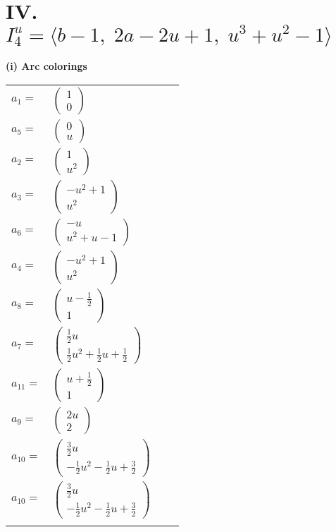 \documentclass[1p]{elsarticle_modified}
\theoremstyle{definition}
\begin{document}
\centering \section*{IV. $I^u_{4}= \langle b-1,\;2 a-2 u+1,\;u^3+u^2-1 \rangle$}
\flushleft \textbf{(i) Arc colorings}\\
\begin{tabular}{m{7pt} m{180pt} m{7pt} m{180pt} }
\flushright $a_{1}=$&$\begin{pmatrix}1\\0\end{pmatrix}$ \\
\flushright $a_{5}=$&$\begin{pmatrix}0\\u\end{pmatrix}$ \\
\flushright $a_{2}=$&$\begin{pmatrix}1\\u^2\end{pmatrix}$ \\
\flushright $a_{3}=$&$\begin{pmatrix}- u^2+1\\u^2\end{pmatrix}$ \\
\flushright $a_{6}=$&$\begin{pmatrix}- u\\u^2+u-1\end{pmatrix}$ \\
\flushright $a_{4}=$&$\begin{pmatrix}- u^2+1\\u^2\end{pmatrix}$ \\
\flushright $a_{8}=$&$\begin{pmatrix}u-\frac{1}{2}\\1\end{pmatrix}$ \\
\flushright $a_{7}=$&$\begin{pmatrix}\frac{1}{2} u\\\frac{1}{2} u^2+\frac{1}{2} u+\frac{1}{2}\end{pmatrix}$ \\
\flushright $a_{11}=$&$\begin{pmatrix}u+\frac{1}{2}\\1\end{pmatrix}$ \\
\flushright $a_{9}=$&$\begin{pmatrix}2 u\\2\end{pmatrix}$ \\
\flushright $a_{10}=$&$\begin{pmatrix}\frac{3}{2} u\\-\frac{1}{2} u^2-\frac{1}{2} u+\frac{3}{2}\end{pmatrix}$\\ \flushright $a_{10}=$&$\begin{pmatrix}\frac{3}{2} u\\-\frac{1}{2} u^2-\frac{1}{2} u+\frac{3}{2}\end{pmatrix}$\\&\end{tabular}
\end{document}
